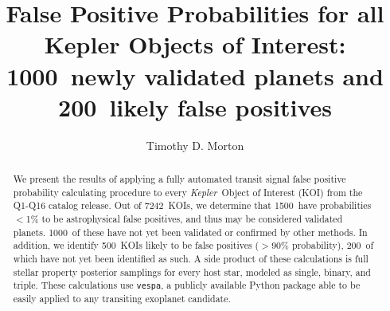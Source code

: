 \documentclass[preprint2]{aastex}
\newcommand{\ncalc}{7242}
\newcommand{\nval}{1500}
\newcommand{\nvalnew}{1000}
\newcommand{\nfp}{500}
\newcommand{\nfpnew}{200}
\newcommand{\kepler}{\textit{Kepler}}
\newcommand{\vespa}{\texttt{vespa}}
\begin{document}

\title{False Positive Probabilities for all Kepler Objects of Interest: \\
        \nvalnew\ newly validated planets and \nfpnew\ likely false positives}


\author{Timothy D. Morton}



\begin{abstract}
We present the results of applying a fully automated transit signal
false positive probability calculating procedure to every
\kepler\ Object of Interest (KOI) from the Q1-Q16 catalog release.
Out of \ncalc\ KOIs, we determine that \nval\ have probabilities
$<$1\% to be astrophysical false positives, and thus may be considered
validated planets.  \nvalnew\ of these have not yet been validated or
confirmed by other methods.  In addition, we identify \nfp\ KOIs
likely to be false positives ($>$90\% probability), \nfpnew\ of which
have not yet been identified as such. A side product of these
calculations is full stellar property posterior samplings for every
host star, modeled as single, binary, and triple.  These calculations
use \vespa, a publicly available Python package able to be easily
applied to any transiting exoplanet candidate.
\end{abstract}

\end{document}
